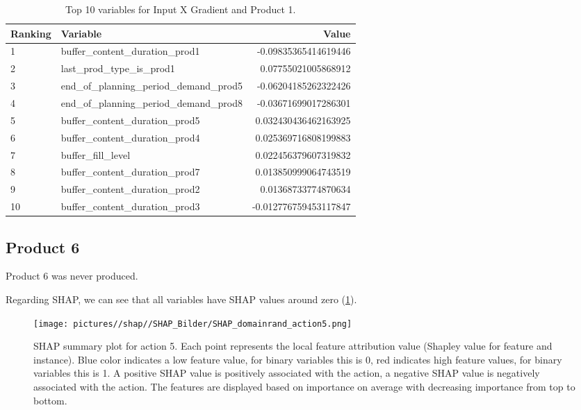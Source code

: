 \begin{table}[ht!]
    \footnotesize
    \centering
    \caption{Top 10 variables for Input X Gradient and Product 1.}
    \label{tab:variables}
    \begin{tabularx}{\textwidth}{lXr}
        \toprule
        \textbf{Ranking} & \textbf{Variable}                        & \textbf{Value}        \\
        \midrule
        1                & buffer\_content\_duration\_prod1         & -0.09835365414619446  \\
        2                & last\_prod\_type\_is\_prod1              & 0.07755021005868912   \\
        3                & end\_of\_planning\_period\_demand\_prod5 & -0.06204185262322426  \\
        4                & end\_of\_planning\_period\_demand\_prod8 & -0.03671699017286301  \\
        5                & buffer\_content\_duration\_prod5         & 0.032430436462163925  \\
        6                & buffer\_content\_duration\_prod4         & 0.025369716808199883  \\
        7                & buffer\_fill\_level                      & 0.022456379607319832  \\
        8                & buffer\_content\_duration\_prod7         & 0.013850999064743519  \\
        9                & buffer\_content\_duration\_prod2         & 0.01368733774870634   \\
        10               & buffer\_content\_duration\_prod3         & -0.012776759453117847 \\
        \bottomrule
    \end{tabularx}
\end{table}
\FloatBarrier



\label{Appendix_Notproduced_Aggs}
\subsection{Product 6}

Product 6 was never produced.

Regarding SHAP, we can see that all variables have SHAP values around zero (\ref{fig:SHAP_Action5}).

\begin{figure}[H]
    \centering
    \texttt{[image: pictures//shap//SHAP\_Bilder/SHAP\_domainrand\_action5.png]}
    \caption{SHAP summary plot for action 5.
        Each point represents the local feature attribution value (Shapley value for feature and instance).
        Blue color indicates a low feature value, for binary variables this is 0, red indicates high feature values, for binary variables this is 1. A positive SHAP value is positively associated with the action, a negative SHAP value is negatively associated with the action. The features are displayed based on importance on average with decreasing importance from top to bottom.}
    \label{fig:SHAP_Action5}
\end{figure}

